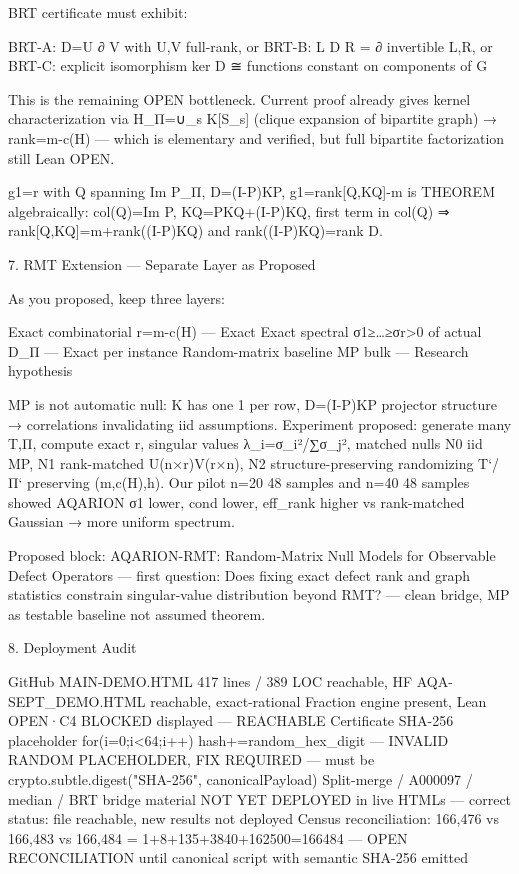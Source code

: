 BRT certificate must exhibit:

BRT-A: D=U ∂ V with U,V full-rank, or
BRT-B: L D R = ∂ invertible L,R, or
BRT-C: explicit isomorphism ker D ≅ {functions constant on components of G}

This is the remaining OPEN bottleneck. Current proof already gives kernel characterization via H_Π=∪_s K[S_s] (clique expansion of bipartite graph) → rank=m-c(H) — which is elementary and verified, but full bipartite factorization still Lean OPEN.

g1=r with Q spanning Im P_Π, D=(I-P)KP, g1=rank[Q,KQ]-m is THEOREM algebraically: col(Q)=Im P, KQ=PKQ+(I-P)KQ, first term in col(Q) ⇒ rank[Q,KQ]=m+rank((I-P)KQ) and rank((I-P)KQ)=rank D.

7. RMT Extension — Separate Layer as Proposed

As you proposed, keep three layers:

Exact combinatorial r=m-c(H) — Exact
Exact spectral σ1≥…≥σr>0 of actual D_Π — Exact per instance
Random-matrix baseline MP bulk — Research hypothesis

MP is not automatic null: K has one 1 per row, D=(I-P)KP projector structure → correlations invalidating iid assumptions. Experiment proposed: generate many T,Π, compute exact r, singular values λ_i=σ_i²/∑σ_j², matched nulls N0 iid MP, N1 rank-matched U(n×r)V(r×n), N2 structure-preserving randomizing T`/Π` preserving (m,c(H),h). Our pilot n=20 48 samples and n=40 48 samples showed AQARION σ1 lower, cond lower, eff_rank higher vs rank-matched Gaussian → more uniform spectrum.

Proposed block: AQARION-RMT: Random-Matrix Null Models for Observable Defect Operators — first question: Does fixing exact defect rank and graph statistics constrain singular-value distribution beyond RMT? — clean bridge, MP as testable baseline not assumed theorem.

8. Deployment Audit

GitHub MAIN-DEMO.HTML 417 lines / 389 LOC reachable, HF AQA-SEPT_DEMO.HTML reachable, exact-rational Fraction engine present, Lean OPEN·C4 BLOCKED displayed — REACHABLE
Certificate SHA-256 placeholder for(i=0;i<64;i++) hash+=random_hex_digit — INVALID RANDOM PLACEHOLDER, FIX REQUIRED — must be crypto.subtle.digest("SHA-256", canonicalPayload)
Split-merge / A000097 / median / BRT bridge material NOT YET DEPLOYED in live HTMLs — correct status: file reachable, new results not deployed
Census reconciliation: 166,476 vs 166,483 vs 166,484 = 1+8+135+3840+162500=166484 — OPEN RECONCILIATION until canonical script with semantic SHA-256 emitted

